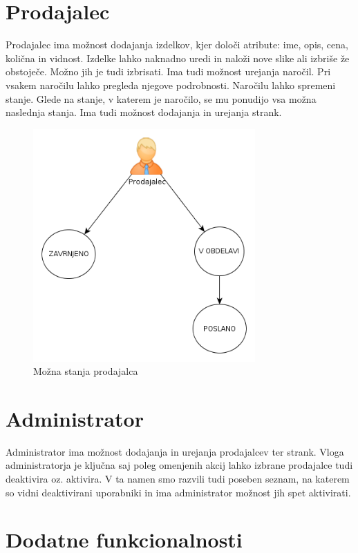 \documentclass[a4paper,12pt]{report}
\begin{document}
\section{Prodajalec}

Prodajalec ima možnost dodajanja izdelkov, kjer določi atribute: ime, opis, cena, količna in vidnost. Izdelke lahko naknadno uredi in naloži nove slike ali izbriše že obstoječe. Možno jih je tudi izbrisati. Ima tudi možnost urejanja naročil. Pri vsakem naročilu lahko pregleda njegove podrobnosti. Naročilu lahko spremeni stanje. Glede na stanje, v katerem je naročilo, se mu ponudijo vsa možna naslednja stanja. Ima tudi možnost dodajanja in urejanja strank.

\begin{figure}[htb]
	\centering
	\includegraphics[width=8.5cm]{img/shema2.png}
	\caption{Možna stanja prodajalca}
\label{fig:1}
\end{figure}

\section{Administrator}

Administrator ima možnost dodajanja in urejanja prodajalcev ter strank. Vloga administratorja je ključna saj poleg omenjenih akcij lahko izbrane prodajalce tudi deaktivira oz. aktivira. V ta namen smo razvili tudi poseben seznam, na katerem so vidni deaktivirani uporabniki in ima administrator možnost jih spet aktivirati.

\section{Dodatne funkcionalnosti}
\end{document}
